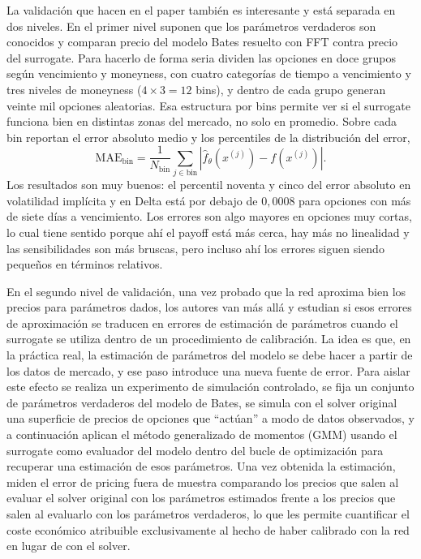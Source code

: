 \documentclass[11pt,a4paper]{article}
\begin{document}
La validación que hacen en el paper también es interesante y está separada en dos niveles. En el primer nivel suponen que los parámetros verdaderos son conocidos y comparan precio del modelo Bates resuelto con FFT contra precio del surrogate. Para hacerlo de forma seria dividen las opciones en doce grupos según vencimiento y moneyness, con cuatro categorías de tiempo a vencimiento y tres niveles de moneyness ($4 \times 3 = 12$ bins), y dentro de cada grupo generan veinte mil opciones aleatorias. Esa estructura por bins permite ver si el surrogate funciona bien en distintas zonas del mercado, no solo en promedio. Sobre cada bin reportan el error absoluto medio y los percentiles de la distribución del error,
\begin{equation}
\mathrm{MAE}_{\mathrm{bin}} = \frac{1}{N_{\mathrm{bin}}} \sum_{j \in \mathrm{bin}} \left| \hat{f}_\theta(x^{(j)}) - f(x^{(j)}) \right|.
\end{equation}
Los resultados son muy buenos: el percentil noventa y cinco del error absoluto en volatilidad implícita y en Delta está por debajo de $0{,}0008$ para opciones con más de siete días a vencimiento. Los errores son algo mayores en opciones muy cortas, lo cual tiene sentido porque ahí el payoff está más cerca, hay más no linealidad y las sensibilidades son más bruscas, pero incluso ahí los errores siguen siendo pequeños en términos relativos.

En el segundo nivel de validación, una vez probado que la red aproxima bien los precios para parámetros dados, los autores van más allá y estudian si esos errores de aproximación se traducen en errores de estimación de parámetros cuando el surrogate se utiliza dentro de un procedimiento de calibración. La idea es que, en la práctica real, la estimación de parámetros del modelo se debe hacer a partir de los datos de mercado, y ese paso introduce una nueva fuente de error. Para aislar este efecto se realiza un experimento de simulación controlado, se fija un conjunto de parámetros verdaderos del modelo de Bates, se simula con el solver original una superficie de precios de opciones que ``actúan'' a modo de datos observados, y a continuación aplican el método generalizado de momentos (GMM) usando el surrogate como evaluador del modelo dentro del bucle de optimización para recuperar una estimación de esos parámetros. Una vez obtenida la estimación, miden el error de pricing fuera de muestra comparando los precios que salen al evaluar el solver original con los parámetros estimados frente a los precios que salen al evaluarlo con los parámetros verdaderos, lo que les permite cuantificar el coste económico atribuible exclusivamente al hecho de haber calibrado con la red en lugar de con el solver.
\end{document}
